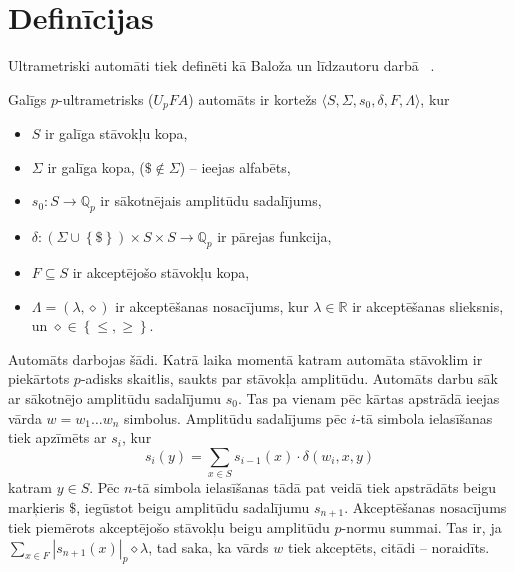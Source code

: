 \documentclass{ludis}
\begin{document}
\section{Definīcijas}
Ultrametriski automāti tiek definēti kā Baloža un līdzautoru darbā ~\citep{KasparsBalodis2013}.
\begin{definicija}
Galīgs $p$-ultrametrisks ($U_pFA$) automāts ir kortežs $\langle S, \Sigma, s_0, \delta, F, \Lambda \rangle$, kur
\begin{itemize}
  \item $S$ ir galīga stāvokļu kopa,
  \item $\Sigma$ ir galīga kopa, ($\$ \notin \Sigma$) -- ieejas alfabēts,
  \item $s_0:S \rightarrow \mathbb{Q}_p$ ir sākotnējais amplitūdu sadalījums, %
  \item $\delta: \left( \Sigma \cup \left\{ \$ \right\} \right) \times S \times S \rightarrow \mathbb{Q}_p$ ir pārejas funkcija,
  \item $F \subseteq S$ ir akceptējošo stāvokļu kopa,
  \item $\Lambda = \left( \lambda, \diamond \right)$ ir akceptēšanas nosacījums, kur $\lambda \in \mathbb{R}$ ir akceptēšanas slieksnis, un $\diamond \in \left\{ \leq, \geq \right\}$.
\end{itemize}
Automāts darbojas šādi.
Katrā laika momentā katram automāta stāvoklim ir piekārtots $p$-adisks skaitlis, saukts par stāvokļa amplitūdu.
Automāts darbu sāk ar sākotnējo amplitūdu sadalījumu $s_0$.
Tas pa vienam pēc kārtas apstrādā ieejas vārda $w = w_1 \ldots w_n$ simbolus.
Amplitūdu sadalījums pēc $i$-tā simbola ielasīšanas tiek apzīmēts ar $s_i$, kur
\[
	s_i(y) = \sum_{x \in S}{s_{i-1}(x) \cdot \delta \left( w_i, x, y \right) }
\]
katram $y \in S$.
Pēc $n$-tā simbola ielasīšanas tādā pat veidā tiek apstrādāts beigu marķieris $\$$, iegūstot beigu amplitūdu sadalījumu $s_{n+1}$.
Akceptēšanas nosacījums tiek piemērots akceptējošo stāvokļu beigu amplitūdu $p$-normu summai. Tas ir, ja $\sum_{x \in F}{\left| s_{n+1}(x) \right|_p} \diamond \lambda$, tad saka, ka vārds $w$ tiek akceptēts, citādi -- noraidīts.
\end{definicija}
\end{document}
